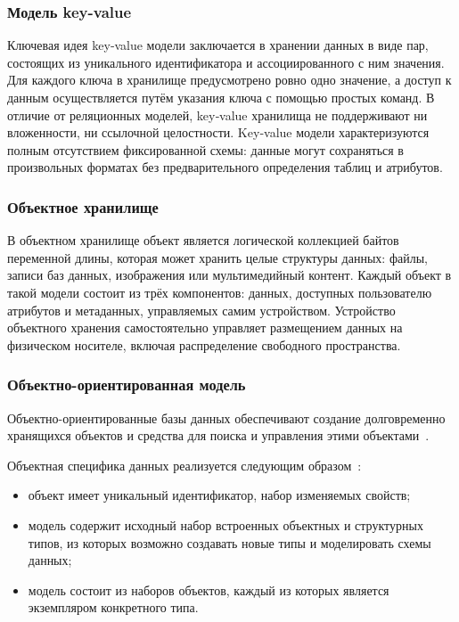 \subsubsection*{Модель key-value}

Ключевая идея key‑value модели заключается в хранении данных в виде пар, состоящих из уникального идентификатора и ассоциированного с ним значения.
Для каждого ключа в хранилище предусмотрено ровно одно значение, а доступ к данным осуществляется путём указания ключа с помощью простых команд.
В отличие от реляционных моделей, key‑value хранилища не поддерживают ни вложенности, ни ссылочной целостности.
Key‑value модели характеризуются полным отсутствием фиксированной схемы: данные могут сохраняться в произвольных форматах без предварительного определения таблиц и атрибутов.~\cite{lit6}

\subsubsection*{Объектное хранилище}

В объектном хранилище объект является логической коллекцией байтов переменной длины, которая может хранить целые структуры данных: файлы, записи баз данных, изображения или мультимедийный контент.
Каждый объект в такой модели состоит из трёх компонентов: данных, доступных пользователю атрибутов и метаданных, управляемых самим устройством.
Устройство объектного хранения самостоятельно управляет размещением данных на физическом носителе, включая распределение свободного пространства.~\cite{lit8}

\subsubsection*{Объектно-ориентированная модель}

Объектно-ориентированные базы данных обеспечивают создание долговременно хранящихся объектов и средства для поиска и управления этими объектами~\cite{lit7}.

Объектная специфика данных реализуется следующим образом~\cite{lit7}:
\begin{itemize}
    \item объект имеет уникальный идентификатор, набор изменяемых свойств;
    \item модель содержит исходный набор встроенных объектных и структурных типов, из которых возможно создавать новые типы и моделировать схемы данных;
    \item модель состоит из наборов объектов, каждый из которых является экземпляром конкретного типа.
\end{itemize}

